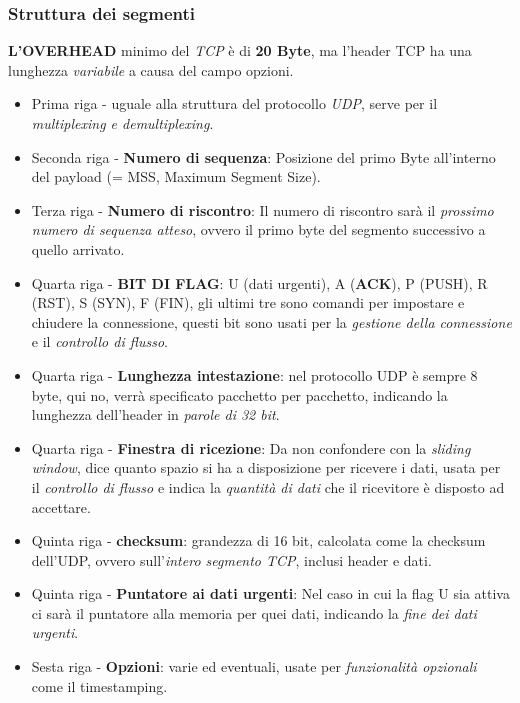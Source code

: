 \subsubsection{Struttura dei segmenti}

\textbf{L'OVERHEAD} minimo del \textit{TCP} è di \textbf{20 Byte}, ma l'header TCP ha una lunghezza \textit{variabile} a causa del campo opzioni.
\begin{itemize}
  \item Prima riga - uguale alla struttura del protocollo \textit{UDP}, serve per il \textit{multiplexing e demultiplexing}.
  \item Seconda riga - \textbf{Numero di sequenza}: Posizione del primo Byte all'interno del payload (= MSS, Maximum Segment Size).
  \item Terza riga - \textbf{Numero di riscontro}: Il numero di riscontro sarà il \textit{prossimo numero di sequenza atteso}, ovvero il primo byte del segmento successivo a quello arrivato.
  \item Quarta riga - \textbf{BIT DI FLAG}: U (dati urgenti), A (\textbf{ACK}), P (PUSH), R (RST), S (SYN), F (FIN), gli ultimi tre sono comandi per impostare e chiudere la connessione, questi bit sono usati per la \textit{gestione della connessione} e il \textit{controllo di flusso}.
  \item Quarta riga - \textbf{Lunghezza intestazione}: nel protocollo UDP è sempre 8 byte, qui no, verrà specificato pacchetto per pacchetto, indicando la lunghezza dell'header in \textit{parole di 32 bit}.
  \item Quarta riga - \textbf{Finestra di ricezione}: Da non confondere con la \textit{sliding window}, dice quanto spazio si ha a disposizione per ricevere i dati, usata per il \textit{controllo di flusso} e indica la \textit{quantità di dati} che il ricevitore è disposto ad accettare.
  \item Quinta riga - \textbf{checksum}: grandezza di 16 bit, calcolata come la checksum dell'UDP, ovvero sull'\textit{intero segmento TCP}, inclusi header e dati.
  \item Quinta riga - \textbf{Puntatore ai dati urgenti}: Nel caso in cui la flag U sia attiva ci sarà il puntatore alla memoria per quei dati, indicando la \textit{fine dei dati urgenti}.
  \item Sesta riga - \textbf{Opzioni}: varie ed eventuali, usate per \textit{funzionalità opzionali} come il timestamping.
\end{itemize}

